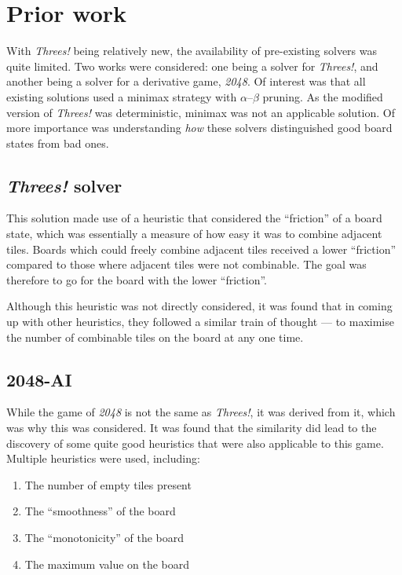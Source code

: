 \documentclass[a4paper, 11pt, titlepage]{report}
\newcommand{\threes}{\emph{Threes!}}
\begin{document}
\section{Prior work}
With \threes{} being relatively new, the availability of pre-existing solvers was quite limited. Two works were considered: one being a solver for \threes{}\cite{tsolver}, and another being a solver for a derivative game, \emph{2048}\cite{2048solver}. Of interest was that all existing solutions used a minimax strategy with $\alpha$--$\beta$ pruning. As the modified version of \threes{} was deterministic, minimax was not an applicable solution. Of more importance was understanding \emph{how} these solvers distinguished good board states from bad ones.

\subsection{\threes{} solver} \label{threes-solver}
This solution\cite{tsolver} made use of a heuristic that considered the ``friction'' of a board state, which was essentially a measure of how easy it was to combine adjacent tiles. Boards which could freely combine adjacent tiles received a lower ``friction'' compared to those where adjacent tiles were not combinable. The goal was therefore to go for the board with the lower ``friction''.

Although this heuristic was not directly considered, it was found that in coming up with other heuristics, they followed a similar train of thought --- to maximise the number of combinable tiles on the board at any one time.

\subsection{2048-AI}\label{2048-solver}
While the game of \emph{2048} is not the same as \threes{}, it was derived from it, which was why this was considered. It was found that the similarity did lead to the discovery of some quite good heuristics that were also applicable to this game. Multiple heuristics were used, including:
\begin{enumerate}
	\item{The number of empty tiles present}
	\item{The ``smoothness'' of the board}
	\item{The ``monotonicity'' of the board}
	\item{The maximum value on the board}
\end{enumerate}
\end{document}
